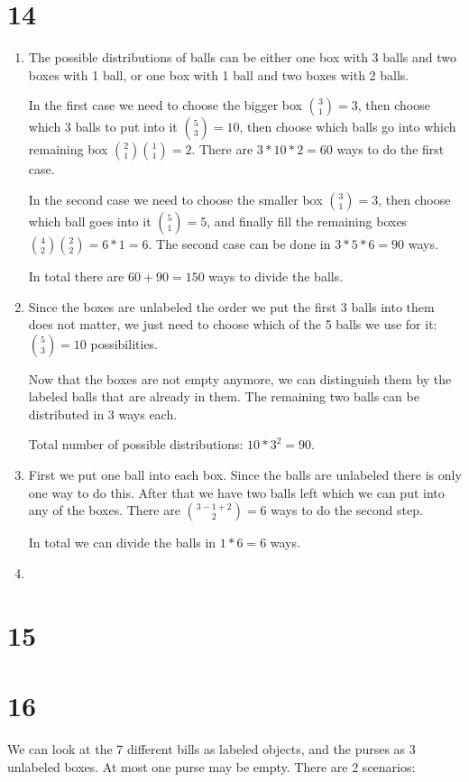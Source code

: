 \documentclass[12pt]{article}
\begin{document}
\section*{14}
\begin{enumerate}[a]
	\item %
	The possible distributions of balls can be either one box with 3 balls and two boxes with 1 ball, or one box with 1 ball and two boxes with 2 balls.

	In the first case we need to choose the bigger box $\binom{3}{1} = 3$, then choose which 3 balls to put into it $\binom{5}{3} = 10$, then choose which balls go into which remaining box $\binom{2}{1} \binom{1}{1} = 2$. There are $3 * 10 * 2 = 60$ ways to do the first case.

	In the second case we need to choose the smaller box $\binom{3}{1} = 3$, then choose which ball goes into it $\binom{5}{1} = 5$, and finally fill the remaining boxes $\binom{4}{2} \binom{2}{2} = 6 * 1 = 6$. The second case can be done in $3 * 5 * 6 = 90$ ways.

	In total there are $60 + 90 = 150$ ways to divide the balls.

	\item %
	Since the boxes are unlabeled the order we put the first 3 balls into them does not matter, we just need to choose which of the 5 balls we use for it: $\binom{5}{3} = 10$ possibilities.

	Now that the boxes are not empty anymore, we can distinguish them by the labeled balls that are already in them. The remaining two balls can be distributed in 3 ways each.

	Total number of possible distributions: $10 * 3^2 = 90$.
	\item %
	First we put one ball into each box. Since the balls are unlabeled there is only one way to do this. After that we have two balls left which we can put into any of the boxes. There are $\binom{3 - 1 + 2}{2} = 6$ ways to do the second step.

	In total we can divide the balls in $1 * 6 = 6$ ways.
	\item %
\end{enumerate}

\section*{15}

\section*{16}
We can look at the 7 different bills as labeled objects, and the purses as 3 unlabeled boxes. At most one purse may be empty. There are 2 scenarios:
\end{document}
